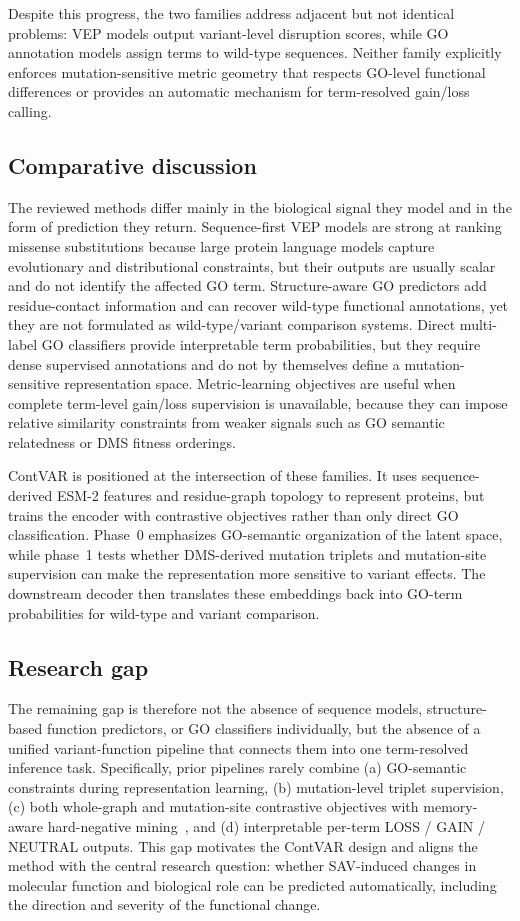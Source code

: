 \documentclass[11pt,a4paper]{article}
\begin{document}
Despite this progress, the two families address adjacent but not identical problems: VEP models output variant-level disruption scores, while GO annotation models assign terms to wild-type sequences. Neither family explicitly enforces mutation-sensitive metric geometry that respects GO-level functional differences or provides an automatic mechanism for term-resolved gain/loss calling.

\subsection{Comparative discussion}
The reviewed methods differ mainly in the biological signal they model and in the form of prediction they return. Sequence-first VEP models are strong at ranking missense substitutions because large protein language models capture evolutionary and distributional constraints, but their outputs are usually scalar and do not identify the affected GO term. Structure-aware GO predictors add residue-contact information and can recover wild-type functional annotations, yet they are not formulated as wild-type/variant comparison systems. Direct multi-label GO classifiers provide interpretable term probabilities, but they require dense supervised annotations and do not by themselves define a mutation-sensitive representation space. Metric-learning objectives are useful when complete term-level gain/loss supervision is unavailable, because they can impose relative similarity constraints from weaker signals such as GO semantic relatedness or DMS fitness orderings.

ContVAR is positioned at the intersection of these families. It uses sequence-derived ESM-2 features and residue-graph topology to represent proteins, but trains the encoder with contrastive objectives rather than only direct GO classification. Phase~0 emphasizes GO-semantic organization of the latent space, while phase~1 tests whether DMS-derived mutation triplets and mutation-site supervision can make the representation more sensitive to variant effects. The downstream decoder then translates these embeddings back into GO-term probabilities for wild-type and variant comparison.

\subsection{Research gap}
The remaining gap is therefore not the absence of sequence models, structure-based function predictors, or GO classifiers individually, but the absence of a unified variant-function pipeline that connects them into one term-resolved inference task. Specifically, prior pipelines rarely combine (a) GO-semantic constraints during representation learning, (b) mutation-level triplet supervision, (c) both whole-graph and mutation-site contrastive objectives with memory-aware hard-negative mining~\cite{schroff2015facenet}, and (d) interpretable per-term LOSS / GAIN / NEUTRAL outputs. This gap motivates the ContVAR design and aligns the method with the central research question: whether SAV-induced changes in molecular function and biological role can be predicted automatically, including the direction and severity of the functional change.
\end{document}
